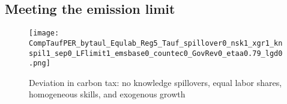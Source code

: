 

\clearpage
\subsection{Meeting the emission limit}\label{app:neccab}

\begin{figure}[h!!]
	\centering
	\caption{\footnotesize{ Deviation in carbon tax: no knowledge spillovers, equal labor shares, homogeneous skills, and exogenous growth}}\label{fig:zeromod_tauf}
	\begin{minipage}[]{0.4\textwidth}
		\centering
		\texttt{[image: CompTaufPER\_bytaul\_Equlab\_Reg5\_Tauf\_spillover0\_nsk1\_xgr1\_knspil1\_sep0\_LFlimit1\_emsbase0\_countec0\_GovRev0\_etaa0.79\_lgd0.png]} 
	\end{minipage}		
\end{figure} 

